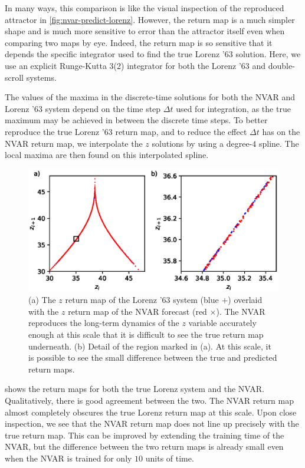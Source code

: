 In many ways, this comparison is like the visual inspection of the
reproduced attractor in \cref{fig:nvar-predict-lorenz}. However, the
return map is a much simpler shape and is much more sensitive to error
than the attractor itself even when comparing two maps by eye. Indeed,
the return map is so sensitive that it depends the specific integrator
used to find the true Lorenz '63 solution. Here, we use an explicit
Runge-Kutta 3(2)\cite{dormand1980} integrator for both the Lorenz '63
and double-scroll systems.

The values of the maxima in the discrete-time solutions for both the
NVAR and Lorenz '63 system depend on the time step $\Delta t$ used for
integration, as the true maximum may be achieved in between the
discrete time steps. To better reproduce the true Lorenz '63 return
map, and to reduce the effect $\Delta t$ has on the NVAR return map,
we interpolate the $z$ solutions by using a degree-$4$ spline. The
local maxima are then found on this interpolated spline.\cite{dierckx1995}

\begin{figure}
  \includegraphics{figures/nvar-lorenz-rmap}
  \caption{(a) The $z$ return map of the Lorenz '63 system (blue $+$)
    overlaid with the $z$ return map of the NVAR forecast (red
    $\times$). The NVAR reproduces the long-term dynamics of the $z$
    variable accurately enough at this scale that it is difficult to
    see the true return map underneath. (b) Detail of the region
    marked in (a). At this scale, it is possible to see the small
    difference between the true and predicted return maps.}
  \label{fig:nvar-lorenz-rmap}
\end{figure}

 shows the return maps for both the true
Lorenz system and the NVAR. Qualitatively, there is good agreement
between the two. The NVAR return map almost completely obscures the
true Lorenz return map at this scale. Upon close inspection, we see
that the NVAR return map does not line up precisely with the true
return map. This can be improved by extending the training time of the
NVAR, but the difference between the two return maps is already small
even when the NVAR is trained for only $10$ units of time.

